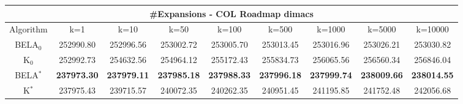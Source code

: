 \begin{tabular}{c|cccccccc}\toprule
\multicolumn{9}{c}{#Expansions - COL Roadmap dimacs}\\ \midrule
Algorithm & k=1 & k=10 & k=50 & k=100 & k=500 & k=1000 & k=5000 & k=10000 \\ \midrule
BELA$_0$ & 252990.80 & 252996.56 & 253002.72 & 253005.70 & 253013.45 & 253016.96 & 253026.21 & 253030.82 \\
K$_0$ & 252992.73 & 254632.56 & 254964.12 & 255172.43 & 255834.73 & 256065.56 & 256560.34 & 256846.04 \\
BELA$^*$ & \textbf{237973.30} & \textbf{237979.11} & \textbf{237985.18} & \textbf{237988.33} & \textbf{237996.18} & \textbf{237999.74} & \textbf{238009.66} & \textbf{238014.55} \\
K$^*$ & 237975.43 & 239715.57 & 240072.35 & 240262.35 & 240951.45 & 241195.85 & 241752.48 & 242056.68 \\ \bottomrule 
\end{tabular}
